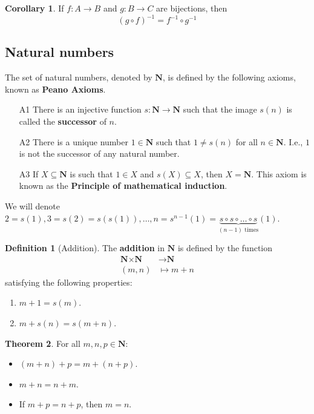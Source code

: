 \documentclass[12pt,a4paper]{article}
\theoremstyle{definition}
\newtheorem{theorem}{Theorem}[section]
\newtheorem{corollary}[theorem]{Corollary}
\newtheorem{definition}{Definition}[section]
\begin{document}
\begin{corollary}
	If $f : A \longrightarrow B$ and $g : B \longrightarrow C$ are bijections, then \[ (g \circ f)^{-1} = f^{-1} \circ g^{-1} \]
\end{corollary}

\subsection{Natural numbers}

The set of natural numbers, denoted by $\textbf{N}$, is defined by the following axioms, known as \textbf{Peano Axioms}.

\begin{enumerate}
	\item[A1] There is an injective function $s : \textbf{N} \longrightarrow \textbf{N}$ such that the image $s(n)$ is called the \textbf{successor} of $n$.
	\item[A2] There is a unique number $1 \in \textbf{N}$ such that $1 \neq s(n)$ for all $n \in \textbf{N}$. I.e., $1$ is not the successor of any natural number.
	\item[A3] If $X \subseteq \textbf{N}$ is such that $1 \in X$ and $s(X) \subseteq X$, then $X = \textbf{N}$. This axiom is known as the \textbf{Principle of mathematical induction}.
\end{enumerate}

We will denote $2 = s(1), 3 = s(2) = s(s(1)), \ldots, n = s^{n-1}(1) = \underbrace{s \circ s \circ \ldots \circ s}_{(n-1) \text{ times}}(1)$.

\begin{definition}[Addition]
	The \textbf{addition} in $\textbf{N}$ is defined by the function
	\begin{equation*}
		\begin{aligned}
			\textbf{N} \times \textbf{N} & \longrightarrow \textbf{N} \\
			(m,n) & \mapsto	m+n
		\end{aligned}
	\end{equation*}
	satisfying the following properties:
	\begin{enumerate}
		\item $m+1 = s(m)$.
		\item $m+s(n) = s(m+n)$.
	\end{enumerate}
\end{definition}

\begin{theorem}
	For all $m,n,p \in \textbf{N}$:
	\begin{itemize}
		\item $(m+n)+p = m+(n+p)$.
		\item $m+n = n+m$.
		\item If $m+p = n+p$, then $m = n$.
	\end{itemize}
\end{theorem}
\end{document}
